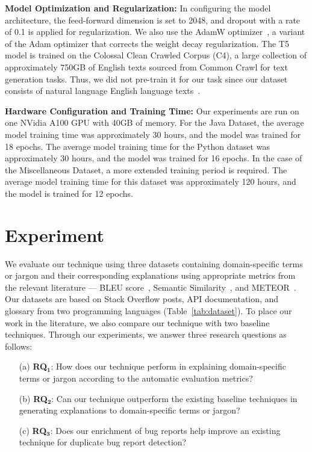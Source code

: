 \textbf{Model Optimization and Regularization:} In configuring the model architecture, the feed-forward dimension is set to 2048, and dropout with a rate of 0.1 is applied for regularization. We also use the AdamW optimizer~\cite{loshchilov2017decoupled}, a variant of the Adam optimizer that corrects the weight decay regularization. The T5 model is trained on the Colossal Clean Crawled Corpus (C4), a large collection of approximately 750GB of English texts sourced from Common Crawl for text generation tasks. Thus, we did not pre-train it for our task since our dataset consists of natural language English language texts~\cite{raffel2020exploring}. \par

\textbf{Hardware Configuration and Training Time:} Our experiments are run on one NVidia A100 GPU with 40GB of memory. For the Java Dataset, the average model training time was approximately 30 hours, and the model was trained for 18 epochs. The average model training time for the Python dataset was approximately 30 hours, and the model was trained for 16 epochs. In the case of the Miscellaneous Dataset, a more extended training period is required. The average model training time for this dataset was approximately 120 hours, and the model is trained for 12 epochs.


\section{Experiment} \label{Chap2:ExperimentalSetup}
We evaluate our technique using three datasets containing domain-specific terms or jargon and their corresponding explanations using appropriate metrics from the relevant literature –-- \acrshort{BLEU} score~\cite{papineni2002bleu}, \acrfull{Semantic Similarity}~\cite{haque2022semantic}, and \acrshort{METEOR}~\cite{banerjee2005meteor}. Our datasets are based on Stack Overflow posts, API documentation, and glossary from two programming languages (Table~\ref{tab:dataset}). To place our work in the literature, we also compare our technique with two baseline techniques. Through our experiments, we answer three research questions as follows:
\begin{enumerate}
\item[(a)] \textbf{RQ$\mathbf{_1}$}: How does our technique perform in explaining domain-specific terms or jargon according to the automatic evaluation metrics?

\item[(b)] \textbf{RQ$\mathbf{_2}$}: Can our technique outperform the existing baseline techniques in generating explanations to domain-specific terms or jargon?

\item[(c)]\textbf{RQ$\mathbf{_3}$}: Does our enrichment of bug reports help improve an existing technique for duplicate bug report detection?
\end{enumerate}


